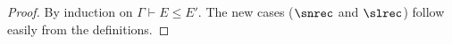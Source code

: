 \preordsound*
\begin{proof}
By induction on $\Gamma \vdash E \leq E'$. The new cases ($\snrec$ and $\slrec$) follow easily from the definitions.
\end{proof}